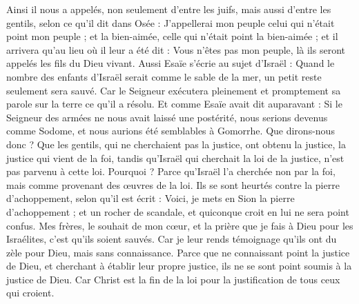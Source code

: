 \begin{multicols}{2}
Ainsi il nous a appelés, non seulement d'entre les juifs, mais aussi d'entre les gentils,
selon ce qu'il dit dans Osée : J'appellerai mon peuple celui qui n'était point mon peuple ; et la bien-aimée, celle qui n'était point la bien-aimée ;
et il arrivera qu'au lieu où il leur a été dit : Vous n’êtes pas mon peuple, là ils seront appelés les fils du Dieu vivant.
Aussi Esaïe s'écrie au sujet d'Israël : Quand le nombre des enfants d'Israël serait comme le sable de la mer, un petit reste seulement sera sauvé.
Car le Seigneur exécutera pleinement et promptement sa parole sur la terre ce qu’il a résolu.
Et comme Esaïe avait dit auparavant : Si le Seigneur des armées ne nous avait laissé une postérité, nous serions devenus comme Sodome, et nous aurions été semblables à Gomorrhe.
Que dirons-nous donc ? Que les gentils, qui ne cherchaient pas la justice, ont obtenu la justice, la justice qui vient de la foi,
tandis qu’Israël qui cherchait la loi de la justice, n'est pas parvenu à cette loi.
Pourquoi ? Parce qu’Israël l’a cherchée non par la foi, mais comme provenant des œuvres de la loi. Ils se sont heurtés contre la pierre d'achoppement,
selon qu’il est écrit : Voici, je mets en Sion la pierre d'achoppement ; et un rocher de scandale, et quiconque croit en lui ne sera point confus.
\VerseOne{}Mes frères, le souhait de mon cœur, et la prière que je fais à Dieu pour les Israélites, c'est qu'ils soient sauvés.
Car je leur rends témoignage qu'ils ont du zèle pour Dieu, mais sans connaissance.
Parce que ne connaissant point la justice de Dieu, et cherchant à établir leur propre justice, ils ne se sont point soumis à la justice de Dieu.
Car Christ est la fin de la loi pour la justification de tous ceux qui croient.

\end{multicols}
